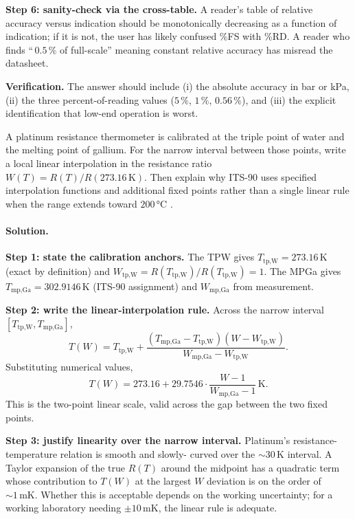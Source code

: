 \begin{exercise}
\textbf{Step 6: sanity-check via the cross-table.}
A reader's table of relative accuracy versus indication should be
monotonically decreasing as a function of indication; if it is not,
the user has likely confused \%FS with \%RD. A reader who finds
``\,$0.5\,\%$ of full-scale'' meaning constant relative accuracy
has misread the datasheet.

\textbf{Verification.} The answer should include (i) the absolute
accuracy in bar or kPa, (ii) the three percent-of-reading values
($5\,\%$, $1\,\%$, $0.56\,\%$), and (iii) the explicit identification
that low-end operation is worst.
\end{exercise}

\begin{exercise}
A platinum resistance thermometer is calibrated at the triple point
of water and the melting point of gallium. For the narrow interval
between those points, write a local linear interpolation in the
resistance ratio $W(T) = R(T) / R(273.16 \,\si{\kelvin})$. Then
explain why ITS-90 uses specified interpolation functions and
additional fixed points rather than a single linear rule when the
range extends toward $200 \,\si{\degreeCelsius}$
\cite{web:bipm-cct-its90}.

\paragraph{Solution.}
\textbf{Step 1: state the calibration anchors.} The TPW gives
$T_{\text{tp,W}} = 273.16 \,\si{\kelvin}$ (exact by definition)
and $W_{\text{tp,W}} = R(T_{\text{tp,W}})/R(T_{\text{tp,W}}) = 1$.
The MPGa gives $T_{\text{mp,Ga}} = 302.9146 \,\si{\kelvin}$
(ITS-90 assignment) and $W_{\text{mp,Ga}}$ from measurement.

\textbf{Step 2: write the linear-interpolation rule.} Across the
narrow interval $[T_{\text{tp,W}}, T_{\text{mp,Ga}}]$,
\[
T(W) = T_{\text{tp,W}}
+ \frac{(T_{\text{mp,Ga}} - T_{\text{tp,W}})
(W - W_{\text{tp,W}})}
{W_{\text{mp,Ga}} - W_{\text{tp,W}}}.
\]
Substituting numerical values,
\[
T(W) = 273.16 + 29.7546 \cdot \frac{W - 1}{W_{\text{mp,Ga}} - 1}
\,\si{\kelvin}.
\]
This is the two-point linear scale, valid across the gap between
the two fixed points.

\textbf{Step 3: justify linearity over the narrow interval.}
Platinum's resistance-temperature relation is smooth and slowly-
curved over the $\sim 30 \,\si{\kelvin}$ interval. A Taylor
expansion of the true $R(T)$ around the midpoint has a quadratic
term whose contribution to $T(W)$ at the largest $W$ deviation is
on the order of $\sim 1 \,\si{\milli\kelvin}$. Whether this is
acceptable depends on the working uncertainty; for a working
laboratory needing $\pm 10 \,\si{\milli\kelvin}$, the linear rule
is adequate.


\end{exercise}
